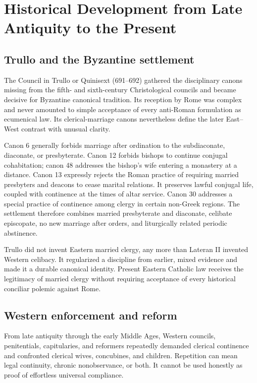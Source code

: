 \section{Historical Development from Late Antiquity to the Present}

\subsection{Trullo and the Byzantine settlement}

The Council in Trullo or Quinisext (691--692) gathered the disciplinary canons missing from the fifth- and sixth-century Christological councils and became decisive for Byzantine canonical tradition. Its reception by Rome was complex and never amounted to simple acceptance of every anti-Roman formulation as ecumenical law. Its clerical-marriage canons nevertheless define the later East--West contrast with unusual clarity.

Canon 6 generally forbids marriage after ordination to the subdiaconate, diaconate, or presbyterate. Canon 12 forbids bishops to continue conjugal cohabitation; canon 48 addresses the bishop's wife entering a monastery at a distance. Canon 13 expressly rejects the Roman practice of requiring married presbyters and deacons to cease marital relations. It preserves lawful conjugal life, coupled with continence at the times of altar service. Canon 30 addresses a special practice of continence among clergy in certain non-Greek regions. The settlement therefore combines married presbyterate and diaconate, celibate episcopate, no new marriage after orders, and liturgically related periodic abstinence.

Trullo did not invent Eastern married clergy, any more than Lateran II invented Western celibacy. It regularized a discipline from earlier, mixed evidence and made it a durable canonical identity. Present Eastern Catholic law receives the legitimacy of married clergy without requiring acceptance of every historical conciliar polemic against Rome.

\subsection{Western enforcement and reform}

From late antiquity through the early Middle Ages, Western councils, penitentials, capitularies, and reformers repeatedly demanded clerical continence and confronted clerical wives, concubines, and children. Repetition can mean legal continuity, chronic nonobservance, or both. It cannot be used honestly as proof of effortless universal compliance.

